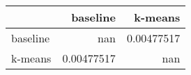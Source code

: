 \begin{tabular}{lrr}
\toprule
          &     baseline &      k-means \\
\midrule
 baseline & nan          &   0.00477517 \\
 k-means  &   0.00477517 & nan          \\
\bottomrule
\end{tabular}